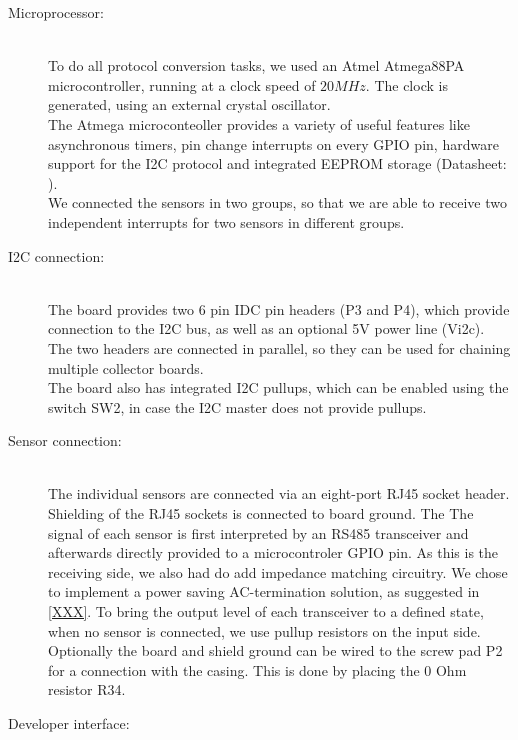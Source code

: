 \documentclass[a4paper]{scrreprt}
\begin{document}
\begin{description}
  \item[Microprocessor:]\hspace{1cm}\\
    To do all protocol conversion tasks, we used an Atmel Atmega88PA
    microcontroller, running at a clock speed of $20MHz$. The clock
    is generated, using an external crystal oscillator.\\
    The Atmega microconteoller provides a variety of useful features
    like asynchronous timers, pin change interrupts on every GPIO
    pin, hardware support for the I2C protocol and integrated EEPROM
    storage (Datasheet: \cite{atmega88}).\\
    We connected the sensors in two groups, so that we are able to
    receive two independent interrupts for two sensors in different
    groups.
  \item[I2C connection:]\hspace{1cm}\\
    The board provides two 6 pin IDC pin headers (P3 and P4), which
    provide connection to the I2C bus, as well as an optional 5V
    power line (Vi2c). The two headers are connected in parallel,
    so they can be used for chaining multiple collector boards.\\
    The board also has integrated I2C pullups, which can be enabled
    using the switch SW2, in case the I2C master does not provide
    pullups.
  \item[Sensor connection:]\hspace{1cm}\\
    The individual sensors are connected via an eight-port RJ45
    socket header. Shielding of the RJ45 sockets is connected to
    board ground. The The signal of each sensor is first interpreted
    by an RS485 transceiver and afterwards directly provided to a
    microcontroler GPIO pin. As this is the receiving side, we also
    had do add impedance matching circuitry. We chose to implement
    a power saving AC-termination solution, as suggested in \ref{XXX}.
    To bring the output level of each transceiver to a defined state,
    when no sensor is connected, we use pullup resistors on the
    input side. Optionally the board and shield ground can be wired to
    the screw pad P2 for a connection with the casing. This is done by
    placing the 0 Ohm resistor R34.
  \item[Developer interface:]\hspace{1cm}\\

\end{description}
\end{document}

